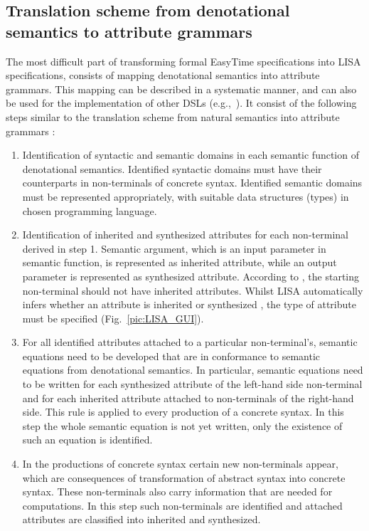 \documentclass[preprint, prX]{revtex4}
\begin{document}
\subsection{Translation scheme from denotational semantics to attribute grammars}

The most difficult part of transforming formal EasyTime specifications into LISA specifications, consists of mapping denotational semantics into attribute grammars. This mapping can be described in a systematic manner, and can also be used for the implementation of other DSLs (e.g.,~\cite{Lukovic:2011}). It consist of the following steps similar to the translation scheme from natural semantics into attribute grammars \cite{Attali1994}:

\begin{enumerate}
  \item Identification of syntactic and semantic domains in each semantic function of denotational semantics. Identified syntactic domains must have their counterparts in non-terminals of concrete syntax. Identified semantic domains must be represented appropriately, with suitable data structures (ty\-pes) in chosen programming language.
  \item Identification of inherited and synthesized attributes for each non-terminal derived in step 1. Semantic argument, which is an input parameter in semantic function, is represented as inherited attribute, while an output parameter is represented as synthesized attribute. According to \cite{Knuth:1968}, the starting non-terminal should not have inherited attributes. Whilst LISA automatically infers whether an attribute is inherited or synthesized \cite{Knuth:1968}, the type of attribute must be specified (Fig.~\ref{pic:LISA_GUI}).
  \item For all identified attributes attached to a particular non-terminal's, semantic equations need to be developed that are in conformance to semantic equations from denotational semantics. In particular, semantic equations need to be written for each synthesized attribute of the left-hand side non-terminal and for each inherited attribute attached to non-terminals of the right-hand side. This rule is applied to every production of a concrete syntax. In this step the whole semantic equation is not yet written, only the existence of such an equation is identified.
  \item In the productions of concrete syntax certain new non-terminals appear, which are consequences of transformation of abstract syntax into concrete syntax. These non-terminals also carry information that are needed for computations. In this step such non-terminals are identified and attached attributes are classified into inherited and synthesized.

\end{enumerate}
\end{document}
